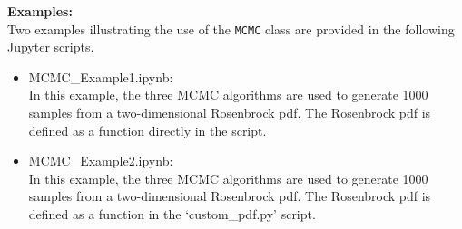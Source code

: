 \documentclass[./UsersGuide.tex]{subfiles}
\begin{document}
\noindent\textbf{Examples:}\\
\noindent Two examples illustrating the use of the \texttt{MCMC} class are provided in the following Jupyter scripts.
\begin{itemize}
\item MCMC\_Example1.ipynb:\\
	In this example, the three MCMC algorithms are used to generate 1000 samples from a two-dimensional Rosenbrock pdf. The Rosenbrock pdf is defined as a function directly in the 	script.
\item MCMC\_Example2.ipynb:\\
	In this example, the three MCMC algorithms are used to generate 1000 samples from a two-dimensional Rosenbrock pdf. The Rosenbrock pdf is defined as a function in the 			`custom\_pdf.py' script.
\end{itemize}

%
%
\end{document}
